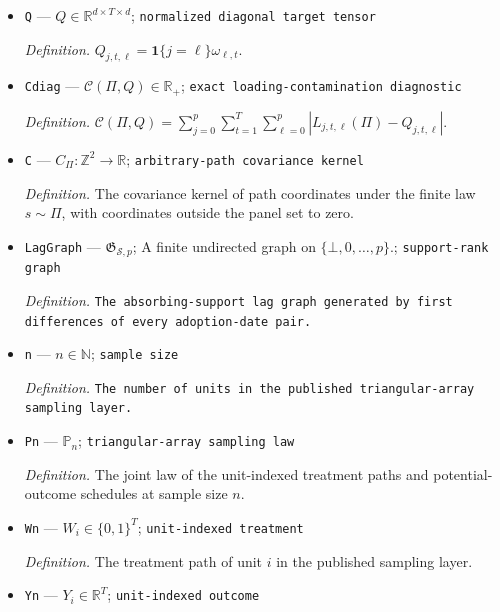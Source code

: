 \documentclass{article}
\begin{document}
\begin{itemize}
  \par\smallskip\noindent\emph{Definition.} Declared calendar weights satisfying \(\sum_{t=1}^{T}\omega_{\ell,t}=1\) and \(\omega_{\ell,t}=0\) when \(t\le\ell\).
  \item \texttt{Q} --- \(Q\in\mathbb R^{d\times T\times d}\); \texttt{normalized diagonal target tensor}
  \par\smallskip\noindent\emph{Definition.} \(Q_{j,t,\ell}=\mathbf 1\{j=\ell\}\omega_{\ell,t}\).
  \item \texttt{Cdiag} --- \(\mathcal C(\Pi,Q)\in\mathbb R_{+}\); \texttt{exact loading-\allowbreak{}contamination diagnostic}
  \par\smallskip\noindent\emph{Definition.} \(\mathcal C(\Pi,Q)=\sum_{j=0}^{p}\sum_{t=1}^{T}\sum_{\ell=0}^{p}|L_{j,t,\ell}(\Pi)-Q_{j,t,\ell}|\).
  \item \texttt{C} --- \(C_{\Pi}:\mathbb Z^2\to\mathbb R\); \texttt{arbitrary-\allowbreak{}path covariance kernel}
  \par\smallskip\noindent\emph{Definition.} The covariance kernel of path coordinates under the finite law \(s\sim\Pi\), with coordinates outside the panel set to zero.
  \item \texttt{LagGraph} --- \(\mathfrak G_{\mathcal S,p}\); A finite undirected graph on \(\{\bot,0,\ldots,p\}\).; \texttt{support-\allowbreak{}rank graph}
  \par\smallskip\noindent\emph{Definition.} \texttt{The absorbing-\allowbreak{}support lag graph generated by first differences of every adoption-\allowbreak{}date pair.}
  \item \texttt{n} --- \(n\in\mathbb N\); \texttt{sample size}
  \par\smallskip\noindent\emph{Definition.} \texttt{The number of units in the published triangular-\allowbreak{}array sampling layer.}
  \item \texttt{Pn} --- \(\mathbb P_n\); \texttt{triangular-\allowbreak{}array sampling law}
  \par\smallskip\noindent\emph{Definition.} The joint law of the unit-indexed treatment paths and potential-outcome schedules at sample size \(n\).
  \item \texttt{Wn} --- \(W_i\in\{0,1\}^{T}\); \texttt{unit-\allowbreak{}indexed treatment}
  \par\smallskip\noindent\emph{Definition.} The treatment path of unit \(i\) in the published sampling layer.
  \item \texttt{Yn} --- \(Y_i\in\mathbb R^{T}\); \texttt{unit-\allowbreak{}indexed outcome}

\end{itemize}
\end{document}
